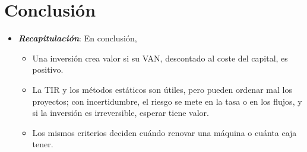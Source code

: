 \documentclass[11pt]{article}
\begin{document}
\section*{Conclusión}

\begin{itemize}
\item \textbf{\emph{Recapitulación}}: En conclusión,
  \begin{itemize}
  \item Una inversión crea valor si su VAN, descontado al coste del capital, es positivo.

  \item La TIR y los métodos estáticos son útiles, pero pueden ordenar mal los proyectos; con incertidumbre, el riesgo se mete en la tasa o en los flujos, y si la inversión es irreversible, esperar tiene valor.

  \item Los mismos criterios deciden cuándo renovar una máquina o cuánta caja tener.


\end{itemize}
\end{itemize}
\end{document}
